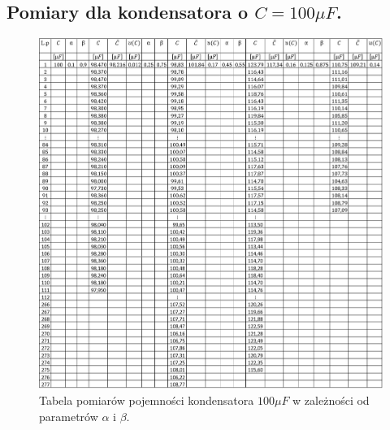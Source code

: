 \documentclass[12pt]{mwart}
\begin{document}
	\subsection{Pomiary dla kondensatora o $C=100\mu F$.}
	\begin{figure}[H]
		\centering
		\includegraphics[width=1\linewidth, height=.92\textheight]{100_tab.jpg}
		\caption{Tabela pomiarów pojemności kondensatora $100\mu F$ w zależności od parametrów $\alpha$ i $\beta$.}
	\end{figure}
\end{document}
